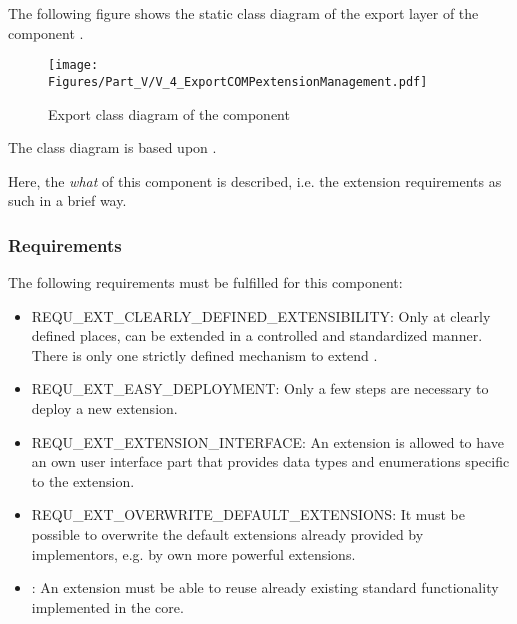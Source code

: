 The following figure shows the static class diagram of the export layer of the component \COMPextensionManagement{}.

\begin{figure}[H]
	\centering
	\texttt{[image: Figures/Part\_V/V\_4\_ExportCOMPextensionManagement.pdf]}
	\caption{Export class diagram of the component \COMPextensionManagement{}}
	\label{fig:V_4_ExportCOMPextensionManagement}
\end{figure}

The class diagram is based upon .

Here, the \emph{what} of this component is described, i.e. the extension requirements as such in a brief way.


\subsubsection{\COMPextensionManagement{} Requirements}
\label{sec:COMPextensionManagementRequirements}

\newcommand{\REQUextClearlyDefinedExtensibility}{REQU\_EXT\_CLEARLY\_DEFINED\_EXTENSIBILITY}
\newcommand{\REQUextEasyDeployment}{REQU\_EXT\_EASY\_DEPLOYMENT}
\newcommand{\REQUextOverwriteDefaultExtensions}{REQU\_EXT\_OVERWRITE\_DEFAULT\_EXTENSIONS}
\newcommand{\REQUextReuseCore}{REQU\_EXT\_REUSE\_CORE}
\newcommand{\REQUextExtensionInterface}{REQU\_EXT\_EXTENSION\_INTERFACE}

The following requirements must be fulfilled for this component:
\begin{itemize}
	\item \REQUextClearlyDefinedExtensibility{}: Only at clearly defined places, \LibName{} can be extended in a controlled and standardized manner. There is only one strictly defined mechanism to extend \LibName{}.
	\item \REQUextEasyDeployment{}: Only a few steps are necessary to deploy a new extension.
	\item \REQUextExtensionInterface{}: An extension is allowed to have an own user interface part that provides data types and enumerations specific to the extension.
	\item \REQUextOverwriteDefaultExtensions{}: It must be possible to overwrite the default extensions already provided by \LibName{} implementors, e.g. by own more powerful extensions.
	\item \REQUreuseCore{}: An extension must be able to reuse already existing standard functionality implemented in the \LibName{} core.
\end{itemize}

